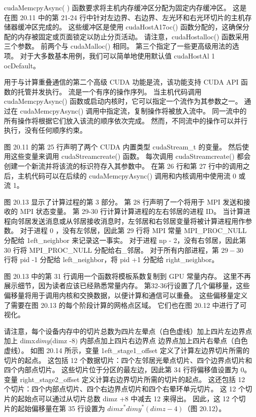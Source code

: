 cudaMemcpyAsync( ) 函数要求将主机内存缓冲区分配为固定内存缓冲区。 
这是在图 20.11 中的第 21-24 行中针对左边界、右边界、左光环和右光环切片的主机存储器缓冲区完成的。 
这些缓冲区是使用 cudaHostA17oc() 函数分配的，这确保分配的内存被固定或页面锁定以防止分页活动。 
请注意，cudaHostalloc() 函数采用三个参数。 前两个与 cudaMalloc() 相同。 
第三个指定了一些更高级用法的选项。 对于大多数基本用例，我们可以简单地使用默认值 cudaHostAl 1 ocDefault。

用于与计算重叠通信的第二个高级 CUDA 功能是流，该功能支持 CUDA API 函数的托管并发执行。 流是一个有序的操作序列。 
当主机代码调用 cudaMemcpyAsync() 函数或启动内核时，它可以指定一个流作为其参数之一。 
通过在 cudaMemcpyAsync() 调用中指定流，复制操作将被放入流中。 同一流中的所有操作将根据它们放入该流的顺序依次完成。 
然而，不同流中的操作可以并行执行，没有任何顺序约束。

图 20.11 的第 25 行声明了两个 CUDA 内置类型 cudaStream\_t 的变量。 
然后使用这些变量来调用 cudaStreamcreate() 函数。 
每次调用 cudaStreamcreate() 都会创建一个新流并将该流的标识符存入其参数中。 
在第 26 行和第 27 行中的调用之后，主机代码可以在后续的 cudaMemcpyAsync() 调用和内核调用中使用流 0 或流 1。

图 20.13 显示了计算过程的第 3 部分。 第 28 行声明了一个将用于 MPI 发送和接收的 MPI 状态变量。 
第 29-30 行计算计算进程的左右邻居的进程 ID。 
当计算进程向邻居发送消息或从邻居接收消息时，左邻居和右邻居变量将被计算进程用作参数。 
对于进程 0 ，没有左邻居，因此第 29 行将 MPI 常量 MPI\_PROC\_NULL 分配给 1eft\_neighbor 来记录这一事实。 
对于进程 np - 2，没有右邻居，因此第 30 行将 MPI\_PROC\_NULL 分配给右\_邻居。 
对于所有内部进程，第 $29-30$ 行将 pid -1 分配给 left\_neighbor，将 pid +1 分配给 right\_neighbor。

图 20.13 中的第 31 行调用一个函数将模板系数复制到 GPU 常量内存。 这里不再展示细节，因为读者应该已经熟悉常量内存。 
第32-36行设置了几个偏移量，这些偏移量将用于调用内核和交换数据，以便计算和通信可以重叠。 
这些偏移量定义了需要在图 20.13 的每个阶段计算的网格点区域。 它们也在图 20.12 中进行了可视化。

请注意，每个设备内存中的切片总数为四片左晕点（白色虚线）加上四片左边界点加上 dimx\textit{dimy}(dimz -8$)$ 内部点加上四片右边界点 边界点加上四片右晕点（白色虚线）。 
如图 20.14 所示，变量 1eft\_stage1\_offset 定义了计算左边界切片所需的切片的起点。 
这包括 12 个数据切片：四个左邻居光晕点切片、四个边界点切片和四个内部点切片。 
这些切片位于分区的最左边，因此第 34 行将偏移值设置为 0。 变量 right\_stage2\_offset 定义计算右边界切片所需的切片的起点。 
这还包括 12 个切片：四个内部点切片、四个右边界点切片和四个右晕环单元切片。 
这 12 个切片的起始点可以通过从切片总数 dimz +8 中减去 12 来得出。 
因此，这 12 个切片的起始偏移量在第 35 行设置为 $d i m x^{*} d i m y^{*}(d i m z-4)$（图 20.12）。

